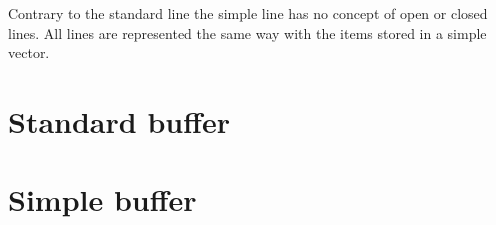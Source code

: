 Contrary to the standard line
 the simple line has no
concept of open or closed lines.  All lines are represented the same
way with the items stored in a simple \commonlisp{} vector.

\section{Standard buffer}
\label{sec-implementation-standard-buffer}

\section{Simple buffer}
\label{sec-implementation-simple-buffer}
